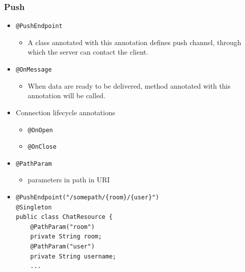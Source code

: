 \documentclass[10pt,xcolor=pdflatex]{beamer}
\begin{document}
\begin{frame}[containsverbatim]\frametitle{Push}
  \begin{itemize}
    \item \texttt{@PushEndpoint}
	  \begin{itemize}
		\item A class annotated with this annotation defines push channel, through which the server can contact the client.
	  \end{itemize}
    \item \texttt{@OnMessage}
	  \begin{itemize}
		\item When data are ready to be delivered, method annotated with this annotation will be called.
	  \end{itemize}
    \item Connection lifecycle annotations
      \begin{itemize}
    	\item \texttt{@OnOpen}
		\item \texttt{@OnClose}
      \end{itemize}
    \item \texttt{@PathParam}
      \begin{itemize}
    	\item parameters in path in URI
      \end{itemize}
    \item[] \begin{footnotesize} \begin{verbatim}
@PushEndpoint("/somepath/{room}/{user}")
@Singleton
public class ChatResource {
    @PathParam("room")
    private String room;
    @PathParam("user")
    private String username;
    ...
\end{verbatim} \end{footnotesize}
  \end{itemize}
\end{frame}
\end{document}
